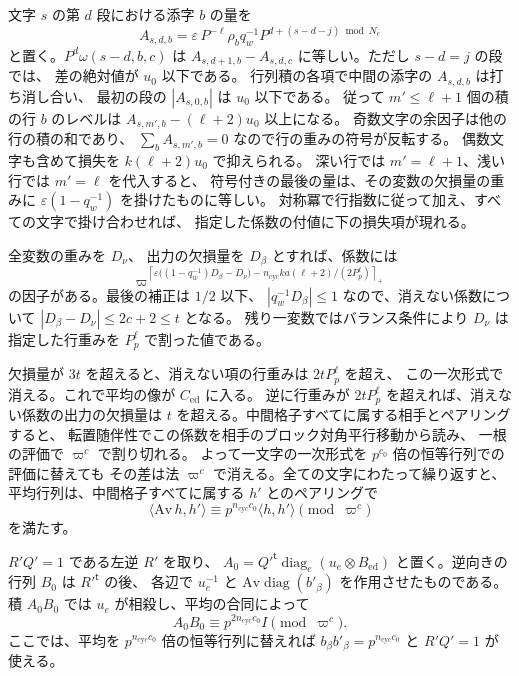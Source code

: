 文字 \(s\) の第 \(d\) 段における添字 \(b\) の量を
\[
 A_{s,d,b}=\varepsilon\,P^{-\ell}\rho_b
                 q_w^{-1}P^{d+(s-d-j)\bmod N_c}
\]
と置く。\(P^d\omega(s-d,b,c)\) は
\(A_{s,d+1,b}-A_{s,d,c}\) に等しい。ただし \(s-d=j\) の段では、
差の絶対値が \(u_0\) 以下である。
行列積の各項で中間の添字の \(A_{s,d,b}\) は打ち消し合い、
最初の段の \(|A_{s,0,b}|\) は \(u_0\) 以下である。
従って \(m'\le\ell+1\) 個の積の行 \(b\) のレベルは
\(A_{s,m',b}-(\ell+2)u_0\) 以上になる。
奇数文字の余因子は他の行の積の和であり、
\(\sum_b A_{s,m',b}=0\) なので行の重みの符号が反転する。
偶数文字も含めて損失を \(k(\ell+2)u_0\) で抑えられる。
深い行では \(m'=\ell+1\)、浅い行では \(m'=\ell\) を代入すると、
符号付きの最後の量は、その変数の欠損量の重みに
\(\varepsilon(1-q_w^{-1})\) を掛けたものに等しい。
対称冪で行指数に従って加え、すべての文字で掛け合わせれば、
指定した係数の付値に下の損失項が現れる。

全変数の重みを \(D_\nu\)、
出力の欠損量を \(D_\beta\) とすれば、係数には
\[
 \varpi^{\left\lceil
      \varepsilon\bigl((1-q_w^{-1})D_\beta-D_\nu\bigr)
      -n_\mathrm{cyc}ka(\ell+2)/(2P_p^\ell)
                 \right\rceil_+}
\]
の因子がある。最後の補正は \(1/2\) 以下、
\(|q_w^{-1}D_\beta|\le1\) なので、消えない係数について
\(|D_\beta-D_\nu|\le2c+2\le t\) となる。
残り一変数ではバランス条件により \(D_\nu\) は指定した行重みを
\(P_p^\ell\) で割った値である。

欠損量が \(3t\) を超えると、消えない項の行重みは \(2tP_p^\ell\) を超え、
この一次形式で消える。これで平均の像が \(C_\mathrm{ed}\) に入る。
逆に行重みが \(2tP_p^\ell\) を超えれば、消えない係数の出力の欠損量は
\(t\) を超える。中間格子すべてに属する相手とペアリングすると、
転置随伴性でこの係数を相手のブロック対角平行移動から読み、
一根の評価で \(\varpi^c\) で割り切れる。
よって一文字の一次形式を \(p^{c_0}\) 倍の恒等行列での評価に替えても
その差は法 \(\varpi^c\) で消える。全ての文字にわたって繰り返すと、
平均行列は、中間格子すべてに属する \(h'\) とのペアリングで
\[
 \langle\mathrm{Av}\,h,h'\rangle
      \equiv p^{n_\mathrm{cyc}c_0}\langle h,h'\rangle\pmod{\varpi^c}
\]
を満たす。

\(R'Q'=1\) である左逆 \(R'\) を取り、
\(A_0=Q'^{\mathsf t}\operatorname{diag}_e(u_e\otimes B_\mathrm{ed})\)
と置く。逆向きの行列 \(B_0\) は \(R'^{\mathsf t}\) の後、
各辺で \(u_e^{-1}\) と \(\mathrm{Av}\operatorname{diag}(b'_\beta)\) を作用させたものである。
積 \(A_0 B_0\) では \(u_e\) が相殺し、平均の合同によって
\[
 A_0 B_0\equiv p^{2n_\mathrm{cyc}c_0}I\pmod{\varpi^c}.
\]
ここでは、平均を \(p^{n_\mathrm{cyc}c_0}\) 倍の恒等行列に替えれば
\(b_\beta b'_\beta=p^{n_\mathrm{cyc}c_0}\) と \(R'Q'=1\) が使える。

